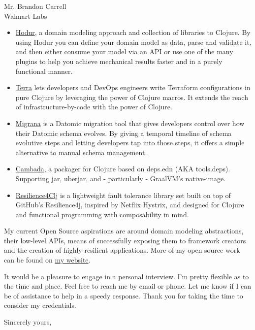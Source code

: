\documentclass{letter} %
\begin{document}
\begin{letter}{Mr. Brandon Carrell \\
Walmart Labs}
\begin{itemize}
\item \href{https://github.com/luchiniatwork/hodur-engine}{Hodur}, a
  domain modeling approach and collection of libraries to Clojure. By
  using Hodur you can define your domain model as data, parse and
  validate it, and then either consume your model via an API or use
  one of the many plugins to help you achieve mechanical results
  faster and in a purely functional manner.

\item \href{https://github.com/luchiniatwork/terra}{Terra} lets
  developers and DevOps engineers write Terraform configurations in
  pure Clojure by leveraging the power of Clojure macros. It extends
  the reach of infrastructure-by-code with the power of Clojure.

\item \href{https://github.com/luchiniatwork/migrana}{Migrana} is a
  Datomic migration tool that gives developers control over how their
  Datomic schema evolves. By giving a temporal timeline of schema
  evolutive steps and letting developers tap into those steps, it
  offers a simple alternative to manual schema management.

\item \href{https://github.com/luchiniatwork/cambada}{Cambada}, a
  packager for Clojure based on deps.edn (AKA tools.deps). Supporting
  jar, uberjar, and - particularly - GraalVM’s native-image.

\item
  \href{https://github.com/luchiniatwork/resilience4clj-circuitbreaker}{Resilience4Clj}
  is a lightweight fault tolerance library set built on top of
  GitHub’s Resilience4j, inspired by Netflix Hystrix, and designed for
  Clojure and functional programming with composability in mind.

\end{itemize}

\noindent My current Open Source aspirations are around domain
modeling abstractions, their low-level APIs, means of successfully
exposing them to framework creators and the creation of
highly-resilient applications. More of my open source work can be
found on \href{https://luchini.nyc}{my website}.

\noindent It would be a pleasure to engage in a personal
interview. I’m pretty flexible as to the time and place. Feel free to
reach me by email or phone. Let me know if I can be of assistance to
help in a speedy response. Thank you for taking the time to consider
my credentials.

\closing{Sincerely yours,}


\end{letter}
\end{document}
